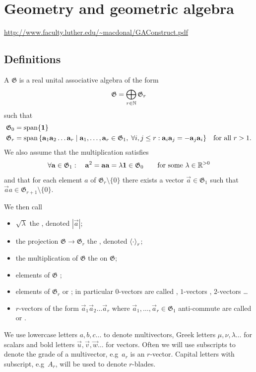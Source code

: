 \section{Geometry and geometric algebra}
\url{http://www.faculty.luther.edu/~macdonal/GAConstruct.pdf}
\subsection{Definitions}

\begin{definition}
A  $\mathfrak{G}$ is a real unital associative algebra of the form
\[ \mathfrak{G} = \bigoplus_{r\in \mathbb{N}}\mathfrak{G}_r \]
such that
\begin{align*}
\mathfrak{G}_0 &= \Span\{\vec{1}\} \\
\mathfrak{G}_r &= \Span\setbuilder{\vec{a}_1\vec{a}_2\ldots\vec{a}_r}{\vec{a}_1,\ldots,\vec{a}_r \in \mathfrak{G}_1, \; \forall i,j\leq r: \vec{a}_i \vec{a}_j = -\vec{a}_j \vec{a}_i} & \text{for all $r>1$}.
\end{align*}
We also assume that the multiplication satisfies
\[ \forall \boldsymbol{\mathrm{a}} \in \mathfrak{G}_1: \quad \boldsymbol{\mathrm{a}}^2 = \boldsymbol{\mathrm{a}}\boldsymbol{\mathrm{a}} = \lambda \boldsymbol{\mathrm{1}} \in \mathfrak{G}_0 \qquad \text{for some $\lambda \in \mathbb{R}^{> 0}$} \]
and that for each element $a$ of $\mathfrak{G}_r\setminus\{0\}$ there exists a vector $\vec{a}\in\mathfrak{G}_1$ such that $\vec{a}a \in \mathfrak{G}_{r+1}\setminus\{0\}$.

We then call
\begin{itemize}
\item $\sqrt{\lambda}$ the , denoted $|\vec{a}|$;
\item the projection $\mathfrak{G} \to \mathfrak{G}_r$ the , denoted $\left\langle \cdot \right\rangle_r$;
\item the multiplication of $\mathfrak{G}$ the  on $\mathfrak{G}$;
\item elements of $\mathfrak{G}$ ;
\item elements of $\mathfrak{G}_r$  or ; in particular $0$-vectors are called , $1$-vectors , $2$-vectors  \ldots
\item $r$-vectors of the form $\vec{a}_1\vec{a}_2\ldots\vec{a}_r$ where $\vec{a}_1,\ldots,\vec{a}_r \in \mathfrak{G}_1$ anti-commute are called  or .
\end{itemize}
We use lowercase letters $a,b,c \ldots$ to denote multivectors, Greek letters $\mu, \nu, \lambda \ldots$ for scalars and bold letters $\vec{u}, \vec{v}, \vec{w} \ldots$ for vectors. Often we will use subscripts to denote the grade of a multivector, e.g\ $a_r$ is an $r$-vector. Capital letters with subscript, e.g\ $A_r$, will be used to denote $r$-blades.
\end{definition}

